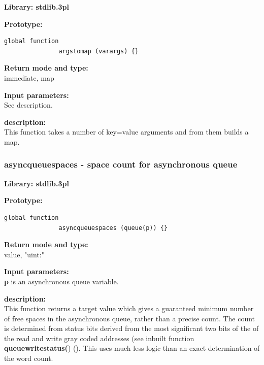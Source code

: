             {\bf Library: stdlib.3pl}

            {\bf Prototype:} \\
            \vsp
            \begin{lstlisting}[gobble=12, language=threepl]
               global function
               argstomap (varargs) {}
            \end{lstlisting}

            {\bf Return mode and type:} \\
            immediate, map

            {\bf Input parameters:} \\            
            See description.

            {\bf description:} \\
            This function takes a number of key=value arguments and from them
            builds a map.



 
            


        \subsubsection{asyncqueuespaces - space count for asynchronous queue}\label{sec:lfasyncqueuespaces}

            {\bf Library: stdlib.3pl}

            {\bf Prototype:} \\
            \vsp
            \begin{lstlisting}[gobble=12, language=threepl]
               global function
               asyncqueuespaces (queue(p)) {}
            \end{lstlisting}

            {\bf Return mode and type:} \\
            value, "uint:"

            {\bf Input parameters:} \\            
            {\bf p} is an asynchronous queue variable.

            {\bf description:} \\
            This function returns a target value which gives a guaranteed
            minimum number of free spaces in the asynchronous queue, rather than
            a precise count. The count is determined from status bits derived
            from the most significant two bits of the of the read and write gray
            coded addresses  (see inbuilt function {\bf queuewritestatus(})
            (). This uses much less logic than
            an exact determination of the word count.
            
